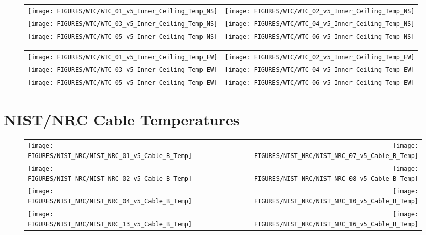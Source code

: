 \clearpage


\begin{figure}[h!]
\begin{tabular*}{\textwidth}{l@{\extracolsep{\fill}}r}
\texttt{[image: FIGURES/WTC/WTC\_01\_v5\_Inner\_Ceiling\_Temp\_NS]} &
\texttt{[image: FIGURES/WTC/WTC\_02\_v5\_Inner\_Ceiling\_Temp\_NS]} \\
\texttt{[image: FIGURES/WTC/WTC\_03\_v5\_Inner\_Ceiling\_Temp\_NS]} &
\texttt{[image: FIGURES/WTC/WTC\_04\_v5\_Inner\_Ceiling\_Temp\_NS]} \\
\texttt{[image: FIGURES/WTC/WTC\_05\_v5\_Inner\_Ceiling\_Temp\_NS]} &
\texttt{[image: FIGURES/WTC/WTC\_06\_v5\_Inner\_Ceiling\_Temp\_NS]}
\end{tabular*}
\label{NIST_WTC_Inner_Ceiling_NS}
\end{figure}

\clearpage

\begin{figure}[h!]
\begin{tabular*}{\textwidth}{l@{\extracolsep{\fill}}r}
\texttt{[image: FIGURES/WTC/WTC\_01\_v5\_Inner\_Ceiling\_Temp\_EW]} &
\texttt{[image: FIGURES/WTC/WTC\_02\_v5\_Inner\_Ceiling\_Temp\_EW]} \\
\texttt{[image: FIGURES/WTC/WTC\_03\_v5\_Inner\_Ceiling\_Temp\_EW]} &
\texttt{[image: FIGURES/WTC/WTC\_04\_v5\_Inner\_Ceiling\_Temp\_EW]} \\
\texttt{[image: FIGURES/WTC/WTC\_05\_v5\_Inner\_Ceiling\_Temp\_EW]} &
\texttt{[image: FIGURES/WTC/WTC\_06\_v5\_Inner\_Ceiling\_Temp\_EW]}
\end{tabular*}
\label{NIST_WTC_Inner_Ceiling_EW}
\end{figure}

\clearpage


\section{NIST/NRC Cable Temperatures}


\begin{figure}[h!]
\begin{tabular*}{\textwidth}{l@{\extracolsep{\fill}}r}
\texttt{[image: FIGURES/NIST\_NRC/NIST\_NRC\_01\_v5\_Cable\_B\_Temp]} &
\texttt{[image: FIGURES/NIST\_NRC/NIST\_NRC\_07\_v5\_Cable\_B\_Temp]} \\
\texttt{[image: FIGURES/NIST\_NRC/NIST\_NRC\_02\_v5\_Cable\_B\_Temp]} &
\texttt{[image: FIGURES/NIST\_NRC/NIST\_NRC\_08\_v5\_Cable\_B\_Temp]} \\
\texttt{[image: FIGURES/NIST\_NRC/NIST\_NRC\_04\_v5\_Cable\_B\_Temp]} &
\texttt{[image: FIGURES/NIST\_NRC/NIST\_NRC\_10\_v5\_Cable\_B\_Temp]} \\
\texttt{[image: FIGURES/NIST\_NRC/NIST\_NRC\_13\_v5\_Cable\_B\_Temp]} &
\texttt{[image: FIGURES/NIST\_NRC/NIST\_NRC\_16\_v5\_Cable\_B\_Temp]}
\end{tabular*}
\label{NIST_NRC_Cable_B_Closed}
\end{figure}

